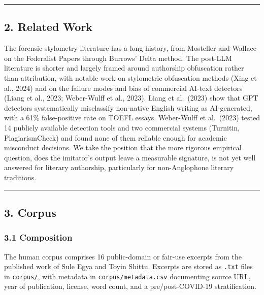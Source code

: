 \begin{center}\rule{0.5\linewidth}{0.5pt}\end{center}

\subsection{2. Related Work}\label{related-work}

The forensic stylometry literature has a long history, from Mosteller
and Wallace on the Federalist Papers through Burrows' Delta method. The
post-LLM literature is shorter and largely framed around authorship
obfuscation rather than attribution, with notable work on stylometric
obfuscation methods (Xing et al., 2024) and on the failure modes and
bias of commercial AI-text detectors (Liang et al., 2023; Weber-Wulff et
al., 2023). Liang et al.~(2023) show that GPT detectors systematically
misclassify non-native English writing as AI-generated, with a 61\%
false-positive rate on TOEFL essays. Weber-Wulff et al.~(2023) tested 14
publicly available detection tools and two commercial systems (Turnitin,
PlagiarismCheck) and found none of them reliable enough for academic
misconduct decisions. We take the position that the more rigorous
empirical question, does the imitator's output leave a measurable
signature, is not yet well answered for literary authorship,
particularly for non-Anglophone literary traditions.

\begin{center}\rule{0.5\linewidth}{0.5pt}\end{center}

\subsection{3. Corpus}\label{corpus}

\subsubsection{3.1 Composition}\label{composition}

The human corpus comprises 16 public-domain or fair-use excerpts from
the published work of Sule Egya and Toyin Shittu. Excerpts are stored as
\texttt{.txt} files in \texttt{corpus/}, with metadata in
\texttt{corpus/metadata.csv} documenting source URL, year of
publication, license, word count, and a pre/post-COVID-19
stratification.

